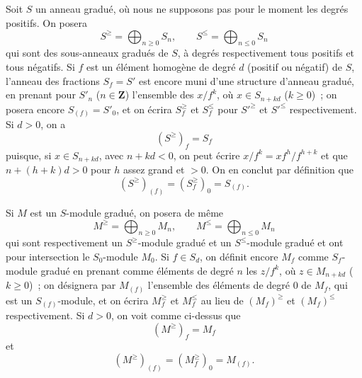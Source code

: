 \begin{env}[8.2.1]
\label{II.8.2.1-fr}
Soit $S$ un anneau gradué, où nous ne supposons pas pour le moment les degrés
positifs. On posera
\begin{equation}
\label{II.8.2.1.1-fr}
  S^{\geq}=\bigoplus_{n\geq0}S_n,
  \qquad
  S^{\leq}=\bigoplus_{n\leq0}S_n
\tag{8.2.1.1}
\end{equation}
qui sont des sous-anneaux gradués de $S$, à degrés respectivement tous
positifs et tous négatifs. Si $f$ est un élément homogène de degré $d$
(positif ou négatif) de $S$, l'anneau des fractions $S_f=S'$ est encore muni
d'une structure d'anneau gradué, en prenant pour $S'_n$ ($n\in\mathbf{Z}$)
l'ensemble des $x/f^k$, où $x\in S_{n+kd}$ ($k\geq0$)~; on posera encore
$S_{(f)}=S'_0$, et on écrira $S_f^{\geq}$ et $S_f^{\leq}$ pour $S'^{\geq}$ et
$S'^{\leq}$ respectivement. Si $d>0$, on a
\begin{equation}
\label{II.8.2.1.2-fr}
  (S^{\geq})_f=S_f
\tag{8.2.1.2}
\end{equation}
puisque, si $x\in S_{n+kd}$, avec $n+kd<0$, on peut écrire
$x/f^k=xf^h/f^{h+k}$ et que $n+(h+k)d>0$ pour $h$ assez grand et $>0$. On en
conclut par définition que
\begin{equation}
\label{II.8.2.1.3-fr}
  (S^{\geq})_{(f)}=(S_f^{\geq})_0=S_{(f)}.
\tag{8.2.1.3}
\end{equation}

Si $M$ est un $S$-module gradué, on posera de même
\begin{equation}
\label{II.8.2.1.4-fr}
  M^{\geq}=\bigoplus_{n\geq0}M_n,
  \qquad
  M^{\leq}=\bigoplus_{n\leq0}M_n
\tag{8.2.1.4}
\end{equation}
qui sont respectivement un $S^{\geq}$-module gradué et un $S^{\leq}$-module
gradué et ont pour intersection le $S_0$-module $M_0$. Si $f\in S_d$, on
définit encore $M_f$ comme $S_f$-module gradué en prenant comme éléments de
degré $n$ les $z/f^k$, où $z\in M_{n+kd}$ ($k\geq0$)~; on désignera par
$M_{(f)}$ l'ensemble des éléments de degré $0$ de $M_f$, qui est un
$S_{(f)}$-module, et on écrira $M_f^{\geq}$ et $M_f^{\leq}$ au lieu de
$(M_f)^{\geq}$ et $(M_f)^{\leq}$ respectivement. Si $d>0$, on voit comme
ci-dessus que
\begin{equation}
\label{II.8.2.1.5-fr}
  (M^{\geq})_f=M_f
\tag{8.2.1.5}
\end{equation}
et
\begin{equation}
\label{II.8.2.1.6-fr}
  (M^{\geq})_{(f)}=(M_f^{\geq})_0=M_{(f)}.
\tag{8.2.1.6}
\end{equation}
\end{env}

